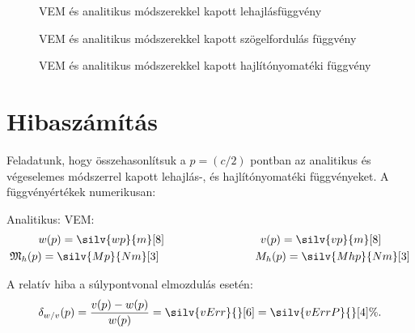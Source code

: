 \documentclass[a4paper, 12pt]{scrartcl}
\begin{document}
\begin{figure}[H]
  \hfill
  
  \vspace{-3mm}
  \caption{VEM és \textcolor{cyan!40!black}{ana}\textcolor{yellow!40!black}{liti}\textcolor{red!40!black}{kus} módszerekkel kapott lehajlásfüggvény}
  \label{fig:plot-v}
\end{figure}
\vspace{-3mm}
\begin{figure}[H]
  \hfill
  
  \vspace{-3mm}
  \caption{VEM és \textcolor{cyan!40!black}{ana}\textcolor{yellow!40!black}{liti}\textcolor{red!40!black}{kus} módszerekkel kapott szögelfordulás függvény}
  \label{fig:plot-phi}
\end{figure}
\vspace{-3mm}
\begin{figure}[H]
  \hfill
  
  \vspace{-3mm}
  \caption{VEM és \textcolor{cyan!40!black}{ana}\textcolor{yellow!40!black}{liti}\textcolor{red!40!black}{kus} módszerekkel kapott hajlítónyomatéki függvény}
  \label{fig:plot-Mh}
\end{figure}

\section{Hibaszámítás}

Feladatunk, hogy összehasonlítsuk a $p = (c / 2)$ pontban az analitikus és 
végeselemes módszerrel kapott lehajlás-, és hajlítónyomatéki függvényeket.
A függvényértékek numerikusan:

\hspace{4cm} Analitikus: \hfill VEM: \hspace{5cm}
\begin{gather}
  w(p) = \silv{wp}{m}[8]
  \hspace{3cm}
  v(p) = \silv{vp}{m}[8]
  \\
  \spec M_h(p) = \silv{Mp}{Nm}[3]
  \hspace{3cm}
  M_h(p) = \silv{Mhp}{Nm}[3]
\end{gather}

A relatív hiba a súlypontvonal elmozdulás esetén:
\begin{equation}
  \delta_{w/v}(p) 
  = \frac{v(p) - w(p)}{w(p)}
  = \silv{vErr}{}[6]
  = \silv{vErrP}{}[4] \%
  \text.
  \label{eq:v-rel}
\end{equation}
\end{document}
